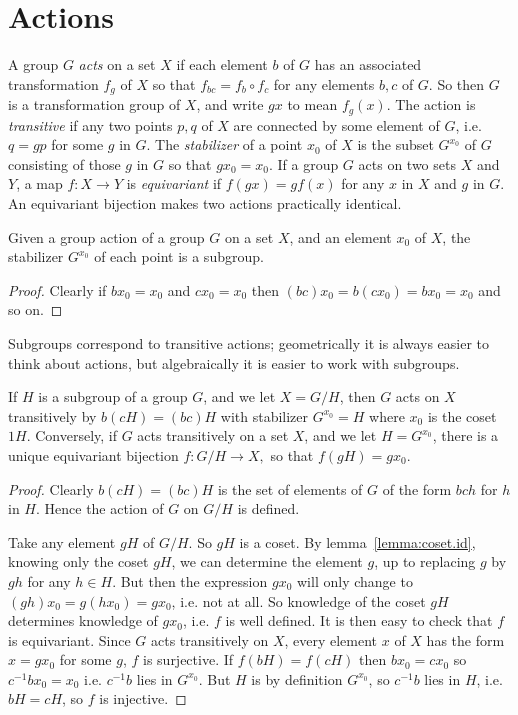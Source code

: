 \section{Actions}
A group \(G\) \emph{acts} on a set \(X\) if each element \(b\) of \(G\) has an associated transformation \(f_g\) of \(X\)  so that \(f_{bc} = f_b \circ f_c\) for any elements \(b, c\) of \(G\).
So then \(G\) is a transformation group of \(X\), and write \(gx\) to mean \(f_g(x)\).
The action is \emph{transitive} if any two points \(p, q\) of \(X\) are connected by some element of \(G\), i.e. \(q=gp\) for some \(g\) in \(G\).
The \emph{stabilizer} of a point \(x_0\) of \(X\) is the subset \(G^{x_0}\) of \(G\) consisting of those \(g\) in \(G\) so that \(gx_0=x_0\).
If a group \(G\) acts on two sets \(X\) and \(Y\), a map \(f \colon X \to Y\) is \emph{equivariant} if \(f(gx)=gf(x)\) for any \(x\) in \(X\) and \(g\) in \(G\).
An equivariant bijection makes two actions practically identical.
\begin{lemma}
Given a group action of a group \(G\) on a set \(X\), and an element \(x_0\) of \(X\), the stabilizer \(G^{x_0}\) of each point is a subgroup.
\end{lemma}
\begin{proof}
Clearly if \(bx_0=x_0\) and \(cx_0=x_0\) then \((bc)x_0=b(cx_0)=bx_0=x_0\) and so on.
\end{proof}
Subgroups correspond to transitive actions; geometrically it is always easier to think about actions, but algebraically it is easier to work with subgroups.
\begin{theorem}
If \(H\) is a subgroup of a group \(G\), and we let \(X=G/H\), then \(G\) acts on \(X\) transitively by \(b(cH)=(bc)H\) with stabilizer \(G^{x_0}=H\) where \(x_0\) is the coset \(1H\).
Conversely, if \(G\) acts transitively on a set \(X\), and we let \(H=G^{x_0}\), there is a unique equivariant bijection
\(
f \colon G/H \to X,
\)
so that \(f(gH)=gx_0\).
\end{theorem}
\begin{proof}
Clearly \(b(cH)=(bc)H\) is the set of elements of \(G\) of the form \(bch\) for \(h\) in \(H\).
Hence the action of \(G\) on \(G/H\) is defined.

Take any element \(gH\) of \(G/H\).
So \(gH\) is a coset.
By lemma~\vref{lemma:coset.id}, knowing only the coset \(gH\), we can determine the element \(g\), up to replacing \(g\) by \(gh\) for any \(h \in H\).
But then the expression \(gx_0\) will only change to \((gh)x_0=g(hx_0)=gx_0\), i.e. not at all.
So knowledge of the coset \(gH\) determines knowledge of \(gx_0\), i.e. \(f\) is well defined.
It is then easy to check that \(f\) is equivariant.
Since \(G\) acts transitively on \(X\), every element \(x\) of \(X\) has the form \(x=gx_0\) for some \(g\), \(f\) is surjective.
If \(f(bH)=f(cH)\) then \(bx_0=cx_0\) so \(c^{-1}bx_0 = x_0\) i.e. \(c^{-1} b\) lies in \(G^{x_0}\).
But \(H\) is by definition \(G^{x_0}\), so \(c^{-1}b\) lies in \(H\), i.e. \(bH=cH\), so \(f\) is injective.
\end{proof}
